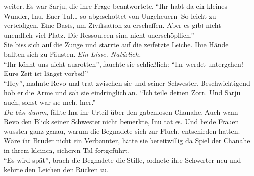 weiter. Es war Sarju, die ihre Frage beantwortete. ``Ihr habt da ein kleines Wunder, Inu. Euer 
Tal... so abgeschottet von Ungeheuern. So leicht zu verteidigen. Eine Basis, um Zivilisation zu 
erschaffen. Aber es gibt nicht unendlich viel Platz. Die Ressourcen sind nicht unerschöpflich.''\\
Sie biss sich auf die Zunge und starrte auf die zerfetzte Leiche. Ihre Hände ballten sich zu 
Fäusten. \textit{Ein Lisoe. Natürlich.}\\
``Ihr könnt uns nicht ausrotten'', fauchte sie schließlich: ``Ihr werdet untergehen! Eure Zeit ist 
längst vorbei!''\\
``Hey'', mahnte Revo und trat zwischen sie und seiner Schwester. Beschwichtigend hob er die Arme 
und sah sie eindringlich an. ``Ich teile deinen Zorn. Und Sarju auch, sonst wär sie nicht hier.''\\
\textit{Du bist dumm}, fällte Inu ihr Urteil über den gabenlosen Chanahe. Auch wenn Revo den Blick 
seiner Schwester nicht bemerkte, Inu tat es. Und beide Frauen wussten ganz genau, warum die 
Begnadete sich zur Flucht entschieden hatten. Wäre ihr Bruder nicht ein Verbannter, hätte sie 
bereitwillig da Spiel der Chanahe in ihrem kleinen, sicheren Tal fortgeführt.\\
``Es wird spät'', brach die Begnadete die Stille, ordnete ihre Schwerter neu und kehrte den Leichen 
den Rücken zu.



